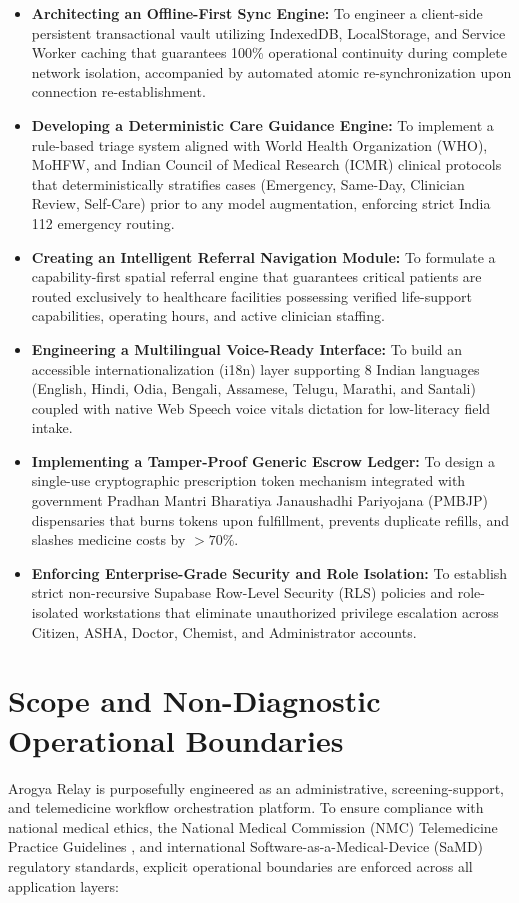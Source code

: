 \documentclass[12pt,a4paper,oneside]{report}
\begin{document}
\begin{itemize}[leftmargin=1.5em,itemsep=1pt,topsep=1pt,parsep=0pt]
    \item \textbf{Architecting an Offline-First Sync Engine:} To engineer a client-side persistent transactional vault utilizing IndexedDB, LocalStorage, and Service Worker caching that guarantees 100\% operational continuity during complete network isolation, accompanied by automated atomic re-synchronization upon connection re-establishment.
    \item \textbf{Developing a Deterministic Care Guidance Engine:} To implement a rule-based triage system aligned with World Health Organization (WHO), MoHFW, and Indian Council of Medical Research (ICMR) clinical protocols that deterministically stratifies cases (Emergency, Same-Day, Clinician Review, Self-Care) prior to any model augmentation, enforcing strict India 112 emergency routing.
    \item \textbf{Creating an Intelligent Referral Navigation Module:} To formulate a capability-first spatial referral engine that guarantees critical patients are routed exclusively to healthcare facilities possessing verified life-support capabilities, operating hours, and active clinician staffing.
    \item \textbf{Engineering a Multilingual Voice-Ready Interface:} To build an accessible internationalization (i18n) layer supporting 8 Indian languages (English, Hindi, Odia, Bengali, Assamese, Telugu, Marathi, and Santali) coupled with native Web Speech voice vitals dictation for low-literacy field intake.
    \item \textbf{Implementing a Tamper-Proof Generic Escrow Ledger:} To design a single-use cryptographic prescription token mechanism integrated with government Pradhan Mantri Bharatiya Janaushadhi Pariyojana (PMBJP) dispensaries that burns tokens upon fulfillment, prevents duplicate refills, and slashes medicine costs by $>70\%$.
    \item \textbf{Enforcing Enterprise-Grade Security and Role Isolation:} To establish strict non-recursive Supabase Row-Level Security (RLS) policies and role-isolated workstations that eliminate unauthorized privilege escalation across Citizen, ASHA, Doctor, Chemist, and Administrator accounts.
\end{itemize}

\section{Scope and Non-Diagnostic Operational Boundaries}
Arogya Relay is purposefully engineered as an administrative, screening-support, and telemedicine workflow orchestration platform. To ensure compliance with national medical ethics, the National Medical Commission (NMC) Telemedicine Practice Guidelines \cite{nmc2020}, and international Software-as-a-Medical-Device (SaMD) regulatory standards, explicit operational boundaries are enforced across all application layers:
\end{document}
